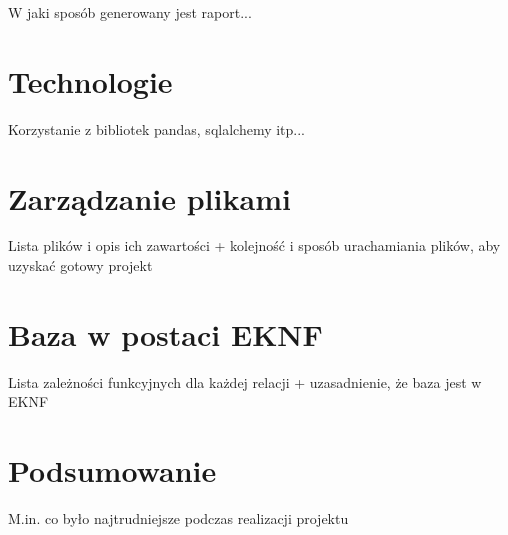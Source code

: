 \documentclass{article}
\begin{document}
	W jaki sposób generowany jest raport...
	
	\section{Technologie}
	
	Korzystanie z bibliotek pandas, sqlalchemy itp...
	
	
	
	\section{Zarządzanie plikami}
	Lista plików i opis ich zawartości + kolejność i sposób urachamiania plików, aby uzyskać gotowy projekt
	
	\section{Baza w postaci EKNF}
	Lista zależności funkcyjnych dla każdej relacji + uzasadnienie, że baza jest w EKNF
	
	\section{Podsumowanie}
	M.in. co było najtrudniejsze podczas realizacji projektu
	
\end{document}
